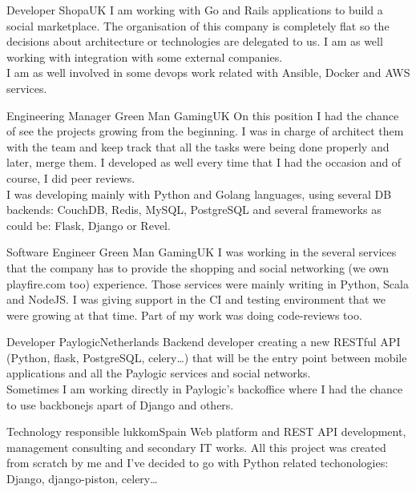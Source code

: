 \documentclass[12pt, a4paper, sans]{moderncv}
\begin{document}
\makecvtitle


%
%

{Developer}
{Shopa}{UK}{}
{I am working with Go and Rails applications to build a social marketplace. The
organisation of this company is completely flat so the decisions about
architecture or technologies are delegated to us. I am as well working with
integration with some external companies.\\I am as well  involved in some
devops work related with Ansible, Docker and AWS services.\\}

{Engineering Manager}
{Green Man Gaming}{UK}{}
{On this position I had the chance of see the projects growing from the
beginning. I was in charge of architect them with the team and keep track that
all the tasks were being done properly and later, merge them. I developed  as
well every time that I had the occasion and of course, I did peer reviews.\\I
was developing mainly with Python and Golang languages, using several DB
backends: CouchDB, Redis, MySQL, PostgreSQL and several frameworks as could be:
Flask, Django or Revel.\\}

{Software Engineer}
{Green Man Gaming}{UK}{}
{I was working in the several services that the company has to provide the
shopping and social networking (we own playfire.com too) experience. Those
services were mainly writing in Python, Scala and NodeJS. I was giving support
in the CI and testing environment that we were growing at that time. Part of my
work was doing code-reviews too.\\}

{Developer}
{Paylogic}{Netherlands}{}
{Backend developer creating a new RESTful API (Python, flask, PostgreSQL,
celery\ldots) that will be the entry point between mobile applications and all
the Paylogic services and social networks.\\Sometimes I am working directly in
Paylogic's backoffice where I had the chance to use backbonejs apart of Django
and others.\\}

{Technology responsible}
{lukkom}{Spain}{}
{Web platform and REST API development, management consulting and secondary IT
works. All this project was created from scratch by me and I've decided to go
with Python related techonologies: Django, django-piston, celery\ldots\\}
\end{document}

